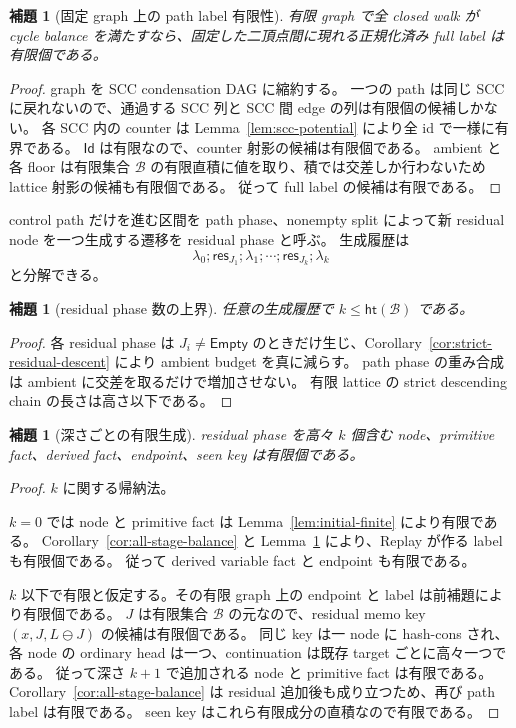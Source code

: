 \documentclass[uplatex,dvipdfmx,a4paper,10.5pt]{jsarticle}
\theoremstyle{jpplain}
\newtheorem{lemma}[definition]{補題}
\newcommand{\Id}{\mathsf{Id}}
\newcommand{\Empty}{\mathsf{Empty}}
\newcommand{\Caps}{\mathcal B}
\newcommand{\height}{\mathsf{ht}}
\begin{document}
\begin{lemma}[固定 graph 上の path label 有限性]\label{lem:path-label-finite}
有限 graph で全 closed walk が cycle balance を満たすなら、固定した二頂点間に現れる正規化済み full label は有限個である。
\end{lemma}

\begin{proof}
graph を SCC condensation DAG に縮約する。
一つの path は同じ SCC に戻れないので、通過する SCC 列と SCC 間 edge の列は有限個の候補しかない。
各 SCC 内の counter は Lemma~\ref{lem:scc-potential} により全 id で一様に有界である。
$\Id$ は有限なので、counter 射影の候補は有限個である。
ambient と各 floor は有限集合 $\Caps$ の有限直積に値を取り、積では交差しか行わないため lattice 射影の候補も有限個である。
従って full label の候補は有限である。
\end{proof}

control path だけを進む区間を path phase、nonempty split によって新 residual node を一つ生成する遷移を residual phase と呼ぶ。
生成履歴は
\[
  \lambda_0;\mathsf{res}_{J_1};\lambda_1;\cdots;
  \mathsf{res}_{J_k};\lambda_k
\]
と分解できる。

\begin{lemma}[residual phase 数の上界]\label{lem:residual-depth}
任意の生成履歴で $k\leq\height(\Caps)$ である。
\end{lemma}

\begin{proof}
各 residual phase は $J_i\neq\Empty$ のときだけ生じ、Corollary~\ref{cor:strict-residual-descent} により ambient budget を真に減らす。
path phase の重み合成は ambient に交差を取るだけで増加させない。
有限 lattice の strict descending chain の長さは高さ以下である。
\end{proof}

\begin{lemma}[深さごとの有限生成]\label{lem:finite-generation-depth}
residual phase を高々 $k$ 個含む node、primitive fact、derived fact、endpoint、seen key は有限個である。
\end{lemma}

\begin{proof}
$k$ に関する帰納法。

$k=0$ では node と primitive fact は Lemma~\ref{lem:initial-finite} により有限である。
Corollary~\ref{cor:all-stage-balance} と Lemma~\ref{lem:path-label-finite} により、Replay が作る label も有限個である。
従って derived variable fact と endpoint も有限である。

$k$ 以下で有限と仮定する。その有限 graph 上の endpoint と label は前補題により有限個である。
$J$ は有限集合 $\Caps$ の元なので、residual memo key
$(x,J,L\ominus J)$ の候補は有限個である。
同じ key は一 node に hash-cons され、各 node の ordinary head は一つ、continuation は既存 target ごとに高々一つである。
従って深さ $k+1$ で追加される node と primitive fact は有限である。
Corollary~\ref{cor:all-stage-balance} は residual 追加後も成り立つため、再び path label は有限である。
seen key はこれら有限成分の直積なので有限である。
\end{proof}
\end{document}
